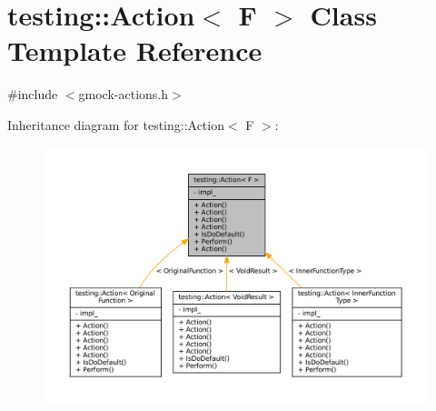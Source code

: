 \hypertarget{classtesting_1_1Action}{}\section{testing\+:\+:Action$<$ F $>$ Class Template Reference}
\label{classtesting_1_1Action}


{\ttfamily \#include $<$gmock-\/actions.\+h$>$}



Inheritance diagram for testing\+:\+:Action$<$ F $>$\+:
\nopagebreak
\begin{figure}[H]
\begin{center}
\leavevmode
\includegraphics[width=350pt]{classtesting_1_1Action__inherit__graph}
\end{center}
\end{figure}


